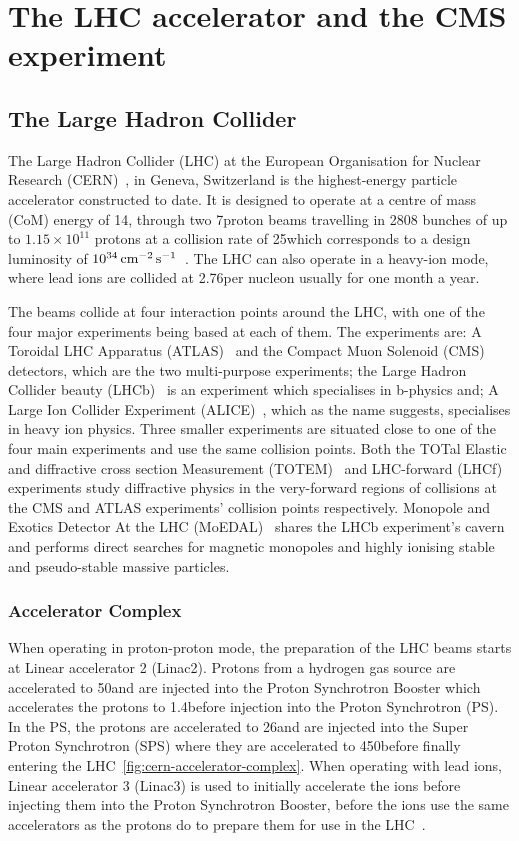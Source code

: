 \chapter{The LHC accelerator and the CMS experiment}\label{chapter:lhc-cms}
\section{The Large Hadron Collider}\label{sec:lhc}

The Large Hadron Collider (LHC) at the European Organisation for Nuclear Research (CERN)~\cite{Bruning:782076}, in Geneva, Switzerland is the highest-energy particle accelerator constructed to date. 
It is designed to operate at a centre of mass (CoM) energy of 14\TeV, through two 7\TeV proton beams travelling in 2808 bunches of up to $1.15 \times 10^{11}$ protons at a collision rate of 25\ns which corresponds to a design luminosity of $10^{34}\,\text{cm}^\text{$-$2}\,\text{s}^\text{$-$1}$~\cite{Bayatian:2006zz}. 
The LHC can also operate in a heavy-ion mode, where lead ions are collided at 2.76\TeV per nucleon usually for one month a year.

The beams collide at four interaction points around the LHC, with one of the four major experiments being based at each of them. 
The experiments are: A Toroidal LHC Apparatus (ATLAS)~\cite{Aad:2008zzm} and the Compact Muon Solenoid (CMS)~\cite{oldcms} detectors, which are the two multi-purpose experiments; the Large Hadron Collider beauty (LHCb)~\cite{Alves:2008zz} is an experiment which specialises in b-physics and; A Large Ion Collider Experiment (ALICE)~\cite{Aamodt:2008zz}, which as the name suggests, specialises in heavy ion physics.
Three smaller experiments are situated close to one of the four main experiments and use the same collision points.
Both the TOTal Elastic and diffractive cross section Measurement (TOTEM)~\cite{Anelli:2008zza} and LHC-forward (LHCf)~\cite{Adriani:2008zz} experiments study diffractive physics in the very-forward regions of collisions at the CMS and ATLAS experiments' collision points respectively.
Monopole and Exotics Detector At the LHC (MoEDAL)~\cite{Pinfold:2009oia} shares the LHCb experiment's cavern and performs direct searches for magnetic monopoles and highly ionising stable and pseudo-stable massive particles.

\subsection{Accelerator Complex}
When operating in proton-proton mode, the preparation of the LHC beams starts at Linear accelerator 2 (Linac2). 
Protons from a hydrogen gas source are accelerated to 50\MeV and are injected into the Proton Synchrotron Booster which accelerates the protons to 1.4\GeV before injection into the Proton Synchrotron (PS). 
In the PS, the protons are accelerated to 26\GeV and are injected into the Super Proton Synchrotron (SPS) where they are accelerated to 450\GeV before finally entering the LHC~\ref{fig:cern-accelerator-complex}. 
When operating with lead ions, Linear accelerator 3 (Linac3) is used to initially accelerate the ions before injecting them into the Proton Synchrotron Booster, before the ions use the same accelerators as the protons do to prepare them for use in the LHC~\cite{Bruning:782076}. 

